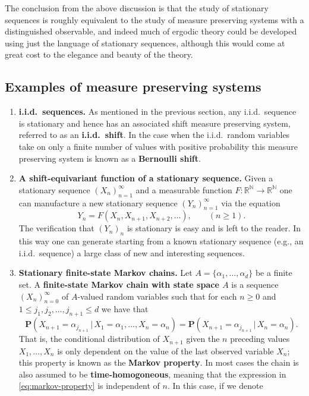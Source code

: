 \documentclass[12pt]{article}
\newcommand{\R}{\mathbb{R}}
\newcommand{\N}{\mathbb{N}}
\newcommand{\prob}{\mathbf{P}}
\theoremstyle{example}
\begin{document}
The conclusion from the above discussion is that the study of stationary sequences is roughly equivalent to the study of measure preserving systems with a distinguished observable, and indeed much of ergodic theory could be developed using just the language of stationary sequences, although this would come at great cost to the elegance and beauty of the theory.

\subsection{Examples of measure preserving systems}

\begin{enumerate}[1.]
\item \textbf{i.i.d.\ sequences.} As mentioned in the previous section, any i.i.d.\ sequence is stationary and hence has an associated shift measure preserving system, referred to as an \textbf{i.i.d.\ shift}. In the case when the i.i.d.\ random variables take on only a finite number of values with positive probability this measure preserving system is known as a \textbf{Bernoulli shift}.
\item \textbf{A shift-equivariant function of a stationary sequence.} Given a stationary sequence $(X_n)_{n=1}^\infty$ and a measurable function $F:\R^\N\to\R^\N$ one can manufacture a new stationary sequence $(Y_n)_{n=1}^\infty$ via the equation
\begin{equation} \label{eq:shift-equivariant} 
Y_n = F(X_n,X_{n+1},X_{n+2},\ldots), \qquad (n\ge 1).
\end{equation}
The verification that $(Y_n)_n$ is stationary is easy and is left to the reader. In this way one can generate starting from a known stationary sequence (e.g., an i.i.d.\ sequence) a large class of new and interesting sequences.
\item \textbf{Stationary finite-state Markov chains.} Let $A=\{\alpha_1,\ldots,\alpha_d\}$ be a finite set. A \textbf{finite-state Markov chain with state space $A$} is a sequence $(X_n)_{n=0}^\infty$ of $A$-valued random variables such that for each $n\ge0$ and $1\le j_1,j_2,\ldots,j_{n+1}\le d$ we have that
\begin{equation} \label{eq:markov-property}
\prob(X_{n+1} = \alpha_{j_{n+1}}\,|\,X_1=\alpha_1,\ldots,X_n=\alpha_n)
=
\prob(X_{n+1} = \alpha_{j_{n+1}}\,|\,X_n=\alpha_n).
\end{equation}
That is, the conditional distribution of $X_{n+1}$ given the $n$ preceding values $X_1,\ldots,X_n$ is only dependent on the value of the last observed variable $X_n$; this property is known as the \textbf{Markov property}. In most cases the chain is also assumed to be \textbf{time-homogoneous}, meaning that the expression in \eqref{eq:markov-property} is independent of $n$. In this case, if we denote

\end{enumerate}
\end{document}
